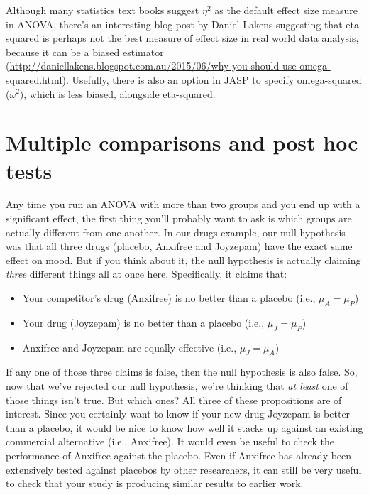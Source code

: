 Although many statistics text books suggest $\eta^2$ as the default effect size measure in ANOVA, there's an interesting blog post by Daniel Lakens suggesting that eta-squared is perhaps not the best measure of effect size in real world data analysis, because it can be a biased estimator (\url{http://daniellakens.blogspot.com.au/2015/06/why-you-should-use-omega-squared.html}). Usefully, there is also an option in JASP to specify omega-squared ($\omega^2$), which is less biased, alongside eta-squared.


\section{Multiple comparisons and post hoc tests~\label{sec:posthoc}}





%
%


Any time you run an ANOVA with more than two groups and you end up with a significant effect, the first thing you'll probably want to ask is which groups are actually different from one another. In our drugs example, our null hypothesis was that all three drugs (placebo, Anxifree and Joyzepam) have the exact same effect on mood. But if you think about it, the null hypothesis is actually claiming {\it three} different things all at once here. Specifically, it claims that:
\begin{itemize} \itemsep 0pt
\item Your competitor's drug (Anxifree) is no better than a placebo (i.e., $\mu_A = \mu_P$)
\item Your drug (Joyzepam) is no better than a placebo (i.e., $\mu_J = \mu_P$)
\item Anxifree and Joyzepam are equally effective (i.e., $\mu_J = \mu_A$)
\end{itemize}
If any one of those three claims is false, then the null hypothesis is also false. So, now that we've rejected our null hypothesis, we're thinking that {\it at least} one of those things isn't true. But which ones? All three of these propositions are of interest. Since you certainly want to know if your new drug Joyzepam is better than a placebo, it would be nice to know how well it stacks up against an existing commercial alternative (i.e., Anxifree). It would even be useful to check the performance of Anxifree against the placebo. Even if Anxifree has already been extensively tested against placebos by other researchers, it can still be very useful to check that your study is producing similar results to earlier work.

